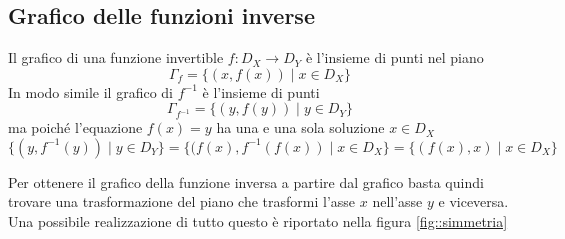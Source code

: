 \documentclass[onecolumn,11pt]{book}\usepackage[]{graphicx}\usepackage[]{color}
\begin{document}
\subsection{Grafico delle funzioni inverse}
Il grafico di una funzione invertible
$f\colon D_X\rightarrow D_Y$ \`e
l'insieme di punti nel piano
\[\Gamma_f=\{(x,f(x))\mid x \in D_X\}\]
In modo simile il grafico di $f^{-1}$ \`e l'insieme di punti
\[\Gamma_{f^{-1}}=\{(y,f(y))\mid y \in D_Y\}\]
ma poich\'e l'equazione $f(x)=y$ ha una e una sola soluzione $x\in D_X$
\[\{(y,f^{-1}(y))\mid y \in D_Y\}=\{(f(x),f^{-1}(f(x))\mid x \in D_X\}=\{(f(x),x)\mid x \in D_X\}\]

Per ottenere il grafico della funzione inversa a partire dal grafico basta quindi trovare una trasformazione del piano che trasformi l'asse $x$ nell'asse $y$ e viceversa. Una possibile realizzazione di tutto questo \`e riportato nella figura \ref{fig::simmetria}
\end{document}
